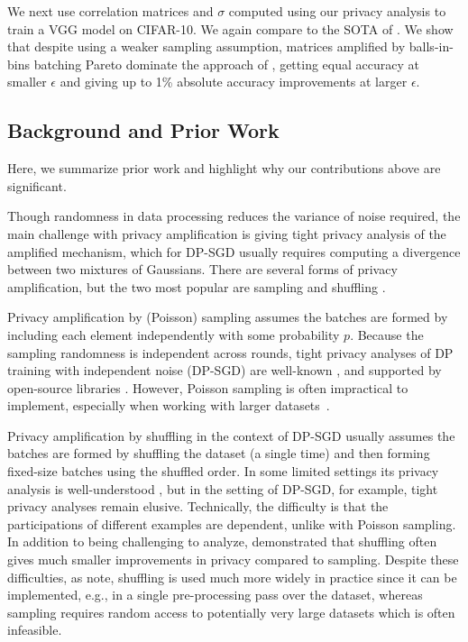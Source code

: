  We next use correlation matrices and $\sigma$ computed using our privacy analysis to train a VGG model on CIFAR-10. We again compare to the SOTA of \citet{choquette2024amplified}. We show that despite using a weaker sampling assumption, matrices amplified by balls-in-bins batching Pareto dominate the approach of \citep{choquette2024amplified}, getting equal accuracy at smaller $\epsilon$ and giving up to 1\% absolute accuracy improvements at larger $\epsilon$. 

\subsection{Background and Prior Work}
\label{sec:prevwork}
Here, we summarize prior work and highlight why our contributions above are significant.

 Though randomness in data processing reduces the variance of noise required, the main challenge with privacy amplification is giving tight privacy analysis of the amplified mechanism, which for DP-SGD usually requires computing a divergence between two mixtures of Gaussians. There are several forms of privacy amplification, but the two most popular are sampling \citep{DP-DL, BBG18} and shuffling \citep{balle2018improving, erlingsson2019private, PAS, feldman22hiding}.

Privacy amplification by (Poisson) sampling assumes the batches are formed by including each element independently with some probability $p$. Because the sampling randomness is independent across rounds, tight privacy analyses of DP training with independent noise (DP-SGD) are well-known \citep{koskela21tight}, and supported by open-source libraries  \citep{dp_accounting}. However, Poisson sampling is often impractical to implement, especially when working with larger datasets~\citep{ponomareva23dpfy}.

Privacy amplification by shuffling in the context of DP-SGD usually assumes the batches are formed by shuffling the dataset (a single time) and then forming fixed-size batches using the shuffled order. In some limited settings its privacy analysis is well-understood \citep{feldman22hiding}, but in the setting of DP-SGD, for example, tight privacy analyses remain elusive. Technically, the difficulty is that the participations of different examples are dependent, unlike with Poisson sampling. In addition to being challenging to analyze, \citet{chua2024private} demonstrated that shuffling often gives much smaller improvements in privacy compared to sampling. Despite these difficulties, as \citet{chua2024private} note, shuffling is used much more widely in practice since it can be implemented, e.g., in a single pre-processing pass over the dataset, whereas sampling requires random access to potentially very large datasets which is often infeasible.


